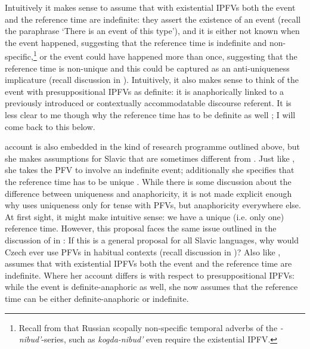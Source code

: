 \documentclass[output=paper,colorlinks,citecolor=brown]{langscibook}
\begin{document}
Intuitively it makes sense to assume that with existential IPFVs both the event and the reference time are indefinite: they assert the existence of an event (recall the paraphrase `There is an event of this type'), and it is either not known when the event happened, suggesting that the reference time is indefinite and non-specific,\footnote{Recall from  that Russian scopally non-specific temporal adverbs of the \textit{-nibud'}-series, such as \textit{kogda-nibud'} even require the existential IPFV.} or the event could have happened more than once, suggesting that the reference time is non-unique and this could be captured as an anti-uniqueness implicature (recall discussion in ). Intuitively, it also makes sense to think of the event with presuppositional IPFVs as definite: it is anaphorically linked to a previously introduced or contextually accommodatable discourse referent. It is less clear to me though why the reference time has to be definite as well%
; I will come back to this below. 

 account is also embedded in the kind of research programme outlined above, but she makes assumptions for Slavic that are sometimes different from . Just like \citeauthor{gronn15}, she takes the PFV to involve an indefinite event; additionally she specifies that the reference time has to be unique%
. While there is some discussion about the difference between uniqueness and anaphoricity, it is not made explicit enough why \citeauthor{alvestad13} uses uniqueness only for tense with PFVs, but anaphoricity everywhere else. At first sight, it might make intuitive sense: we have a unique (i.e. only one) reference time. However, this proposal faces the same issue outlined in the discussion of \citet{Mueller-Reichau2018a} in : If this is a general proposal for all Slavic languages, why would Czech ever use PFVs in habitual contexts (recall discussion in )? Also like \citeauthor{gronn15}, \citeauthor{alvestad13} assumes that with existential IPFVs both the event and the reference time are indefinite. Where her account differs is with respect to presuppositional IPFVs: while the event is definite-anaphoric as well, she now assumes that the reference time can be either definite-anaphoric or indefinite.
\end{document}
